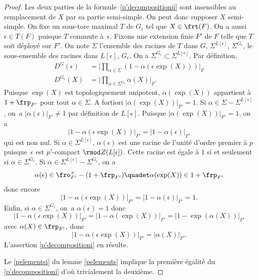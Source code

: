 \begin{proof}
Les deux parties de la formule~\eqref{p'decompositionii} sont insensibles au remplacement de $X$ par sa partie semi-simple. On peut donc supposer $X$ semi-simple. On fixe un sous-tore maximal $T$ de $G_{\epsilon}$ tel que $X\in \frt(F)$. On a aussi $\epsilon\in T(F)$ puisque $T$ commute à~$\epsilon$. Fixons une extension finie $F'$ de $F$ telle que $T$ soit déployé sur $F'$. On note $\Sigma$ l'ensemble des racines de $T$ dans $G$, $\Sigma^{L[\epsilon]}$, \resp $\Sigma^{G_{\epsilon}}$, le sous-ensemble des racines dans $L[\epsilon]$, \resp $G_{\epsilon}$. On a $\Sigma^{G_{\epsilon}}\subset \Sigma^{L[\epsilon]}$. Par définition,
\begin{align*}
D^G(\epsilon)&=\bigl\vert \textstyle\prod_{\alpha\in \Sigma}(1-\alpha(\epsilon \exp(X)))\bigr\vert _{F}
\\
D^{G_{\epsilon}}(X)&=\bigl\vert \textstyle\prod_{\alpha\in \Sigma^{G_{\epsilon}}}\alpha(X)\bigr\vert _{F}.
\end{align*}
Puisque $\exp(X)$ est topologiquement unipotent, $\alpha(\exp(X))$ appartient à $1+\frp_{F'}$ pour tout $\alpha\in \Sigma$. A fortiori $\vert \alpha(\exp(X))\vert _{F'}=1$.
Si $\alpha\in \Sigma-\Sigma^{L[\epsilon]}$, on~a $\vert \alpha(\epsilon)\vert _{F'}\neq1$ par définition de $L[\epsilon]$. Puisque $\vert \alpha(\exp(X))\vert _{F'}=1$, on a
\[
\vert 1-\alpha(\epsilon \exp(X))\vert _{F'}=\vert 1-\alpha(\epsilon)\vert _{F'}
\]
qui est non nul. Si $\alpha\in \Sigma^{L[\epsilon]}$, $\alpha(\epsilon)$ est une racine de l'unité d'ordre premier à $p$ puisque~$\epsilon$ est $p'$-compact $\rmod Z(L[\epsilon])$. Cette racine est égale à $1$ si et seulement si $\alpha\in \Sigma^{G_{\epsilon}}$. Si $\alpha\in \Sigma^{L[\epsilon]}-\Sigma^{G_{\epsilon}}$, on a
\[
\alpha(\epsilon)\in \fro_{F'}^{\times}-(1+\frp_{F'})\quadet\alpha(\exp(X))\in 1+\frp_{F'}
\]
donc encore
\[
\vert 1-\alpha(\epsilon \exp(X))\vert _{F'}=\vert 1-\alpha(\epsilon)\vert _{F'}=1.
\]
Enfin, si $\alpha\in \Sigma^{G_{\epsilon}}$, on~a $\alpha(\epsilon)=1$ donc
\[
\vert 1-\alpha (\epsilon \exp(X))\vert _{F'}=\vert 1-\alpha(\exp(X))\vert _{F'}=\vert 1-\exp(\alpha(X))\vert _{F'}
\]
avec $\alpha(X)\in \frp_{F'}$, donc
\[
\vert 1-\alpha (\epsilon \exp(X))\vert _{F'}=\vert \alpha(X)\vert _{F'}.
\]
L'assertion \eqref{p'decompositioni} en résulte.

Le \eqref{pelementsi} du lemme \ref{pelements} implique la première égalité du \eqref{p'decompositioni} d'où trivialement la deuxième.


\end{proof}
